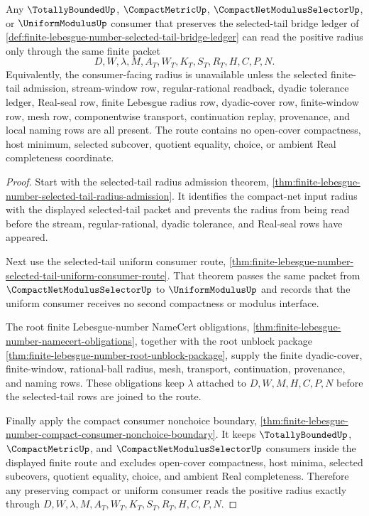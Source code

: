 \begin{theorem}
\label{thm:finite-lebesgue-number-total-bounded-radius-source-lock}
Any $\TotallyBoundedUp$, $\CompactMetricUp$, $\CompactNetModulusSelectorUp$, or $\UniformModulusUp$ consumer that preserves the selected-tail bridge ledger of \autoref{def:finite-lebesgue-number-selected-tail-bridge-ledger} can read the positive radius only through the same finite packet
$$
D,W,\lambda,M,A_T,W_T,K_T,S_T,R_T,H,C,P,N .
$$
Equivalently, the consumer-facing radius is unavailable unless the selected finite-tail admission, stream-window row, regular-rational readback, dyadic tolerance ledger, Real-seal row, finite Lebesgue radius row, dyadic-cover row, finite-window row, mesh row, componentwise transport, continuation replay, provenance, and local naming rows are all present. The route contains no open-cover compactness, host minimum, selected subcover, quotient equality, choice, or ambient Real completeness coordinate.
\end{theorem}
\begin{proof}
Start with the selected-tail radius admission theorem, \autoref{thm:finite-lebesgue-number-selected-tail-radius-admission}. It identifies the compact-net input radius with the displayed selected-tail packet and prevents the radius from being read before the stream, regular-rational, dyadic tolerance, and Real-seal rows have appeared.

Next use the selected-tail uniform consumer route, \autoref{thm:finite-lebesgue-number-selected-tail-uniform-consumer-route}. That theorem passes the same packet from $\CompactNetModulusSelectorUp$ to $\UniformModulusUp$ and records that the uniform consumer receives no second compactness or modulus interface.

The root finite Lebesgue-number NameCert obligations, \autoref{thm:finite-lebesgue-number-namecert-obligations}, together with the root unblock package \autoref{thm:finite-lebesgue-number-root-unblock-package}, supply the finite dyadic-cover, finite-window, rational-ball radius, mesh, transport, continuation, provenance, and naming rows. These obligations keep $\lambda$ attached to $D,W,M,H,C,P,N$ before the selected-tail rows are joined to the route.

Finally apply the compact consumer nonchoice boundary, \autoref{thm:finite-lebesgue-number-compact-consumer-nonchoice-boundary}. It keeps $\TotallyBoundedUp$, $\CompactMetricUp$, and $\CompactNetModulusSelectorUp$ consumers inside the displayed finite route and excludes open-cover compactness, host minima, selected subcovers, quotient equality, choice, and ambient Real completeness. Therefore any preserving compact or uniform consumer reads the positive radius exactly through $D,W,\lambda,M,A_T,W_T,K_T,S_T,R_T,H,C,P,N$.
\end{proof}
